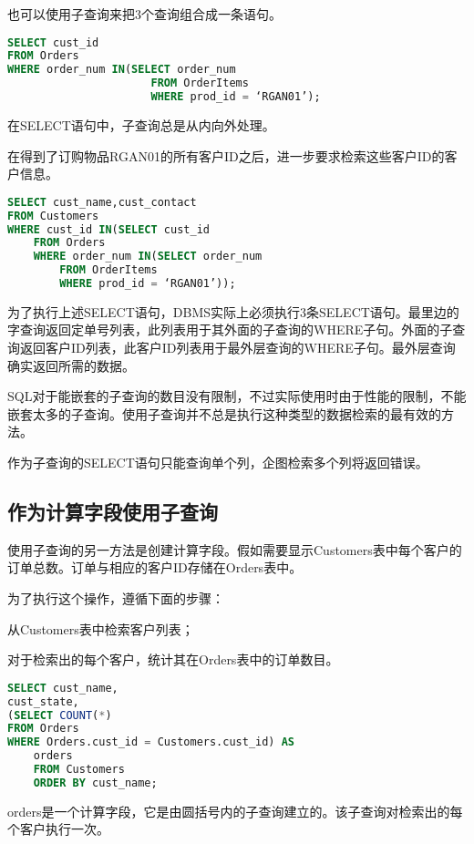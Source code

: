也可以使用子查询来把3个查询组合成一条语句。

\begin{lstlisting}[language=SQL]
SELECT cust_id
FROM Orders
WHERE order_num IN(SELECT order_num
					  FROM OrderItems
					  WHERE prod_id = ‘RGAN01’);
\end{lstlisting}

在SELECT语句中，子查询总是从内向外处理。

在得到了订购物品RGAN01的所有客户ID之后，进一步要求检索这些客户ID的客户信息。

\begin{lstlisting}[language=SQL]
SELECT cust_name,cust_contact
FROM Customers
WHERE cust_id IN(SELECT cust_id
	FROM Orders
	WHERE order_num IN(SELECT order_num
		FROM OrderItems
		WHERE prod_id = ‘RGAN01’));
\end{lstlisting}

为了执行上述SELECT语句，DBMS实际上必须执行3条SELECT语句。最里边的字查询返回定单号列表，此列表用于其外面的子查询的WHERE子句。外面的子查询返回客户ID列表，此客户ID列表用于最外层查询的WHERE子句。最外层查询确实返回所需的数据。

SQL对于能嵌套的子查询的数目没有限制，不过实际使用时由于性能的限制，不能嵌套太多的子查询。使用子查询并不总是执行这种类型的数据检索的最有效的方法。

作为子查询的SELECT语句只能查询单个列，企图检索多个列将返回错误。
\subsection{作为计算字段使用子查询}

使用子查询的另一方法是创建计算字段。假如需要显示Customers表中每个客户的订单总数。订单与相应的客户ID存储在Orders表中。

为了执行这个操作，遵循下面的步骤：

\begin{compactenum}
\item 从Customers表中检索客户列表；
\item 对于检索出的每个客户，统计其在Orders表中的订单数目。
\end{compactenum}

\begin{lstlisting}[language=SQL]
SELECT cust_name,
cust_state,
(SELECT COUNT(*)
FROM Orders
WHERE Orders.cust_id = Customers.cust_id) AS
	orders
	FROM Customers
	ORDER BY cust_name;
\end{lstlisting}

orders是一个计算字段，它是由圆括号内的子查询建立的。该子查询对检索出的每个客户执行一次。


